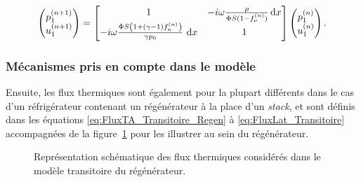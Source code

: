 \begin{equation}
	\begin{pmatrix}
	p_1^{(n+1)}\\
	u_1^{(n+1)}
	\end{pmatrix}=\begin{bmatrix}
	1 & -i\omega\frac{\rho}{\Phi S(1-f_\nu^{(n)})}\,\mathrm{d} x\\
	-i\omega\frac{\Phi S \left(1 + (\gamma-1)f_\kappa^{(n)}\right)}{\gamma p_0}\ \mathrm{d} x & 1
	\end{bmatrix}\begin{pmatrix}
	p_1^{(n)}\\
	u_1^{(n)}
	\end{pmatrix}.
\end{equation}


\subsubsection{Mécanismes pris en compte dans le modèle}
Ensuite, les flux thermiques sont également pour la plupart différents dans le cas d'un réfrigérateur contenant un régénérateur à la place d'un \textit{stack}, et sont définis dans les équations \eqref{eq:FluxTA_Transitoire_Regen} à \eqref{eq:FluxLat_Transitoire} accompagnées de la figure~\ref{fig:Schema_FluxThermiquesNoyau_Gaelle} pour les illustrer au sein du régénérateur.

\begin{figure}[!ht]
    \centering
    
    \caption{Représentation schématique des flux thermiques considérés dans le modèle transitoire du régénérateur.}
    \label{fig:Schema_FluxThermiquesNoyau_Gaelle}
\end{figure}

